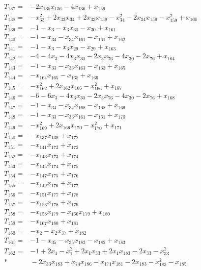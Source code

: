 \begin{align*}
T_{137}={}&-2x_{135}x_{136}-4x_{136}+x_{159}\\[3pt]
T_{138}={}&-x_{33}^{2}+2x_{33}x_{34}+2x_{33}x_{159}-x_{34}^{2}-2x_{34}x_{159}-x_{159}^{2}+x_{160}\\[3pt]
T_{139}={}&-1-x_{3}-x_{3}x_{30}-x_{30}+x_{161}\\[3pt]
T_{140}={}&-1-x_{34}-x_{34}x_{161}-x_{161}+x_{162}\\[3pt]
T_{141}={}&-1-x_{3}-x_{3}x_{29}-x_{29}+x_{163}\\[3pt]
T_{142}={}&-4-4x_{3}-4x_{3}x_{30}-2x_{3}x_{76}-4x_{30}-2x_{76}+x_{164}\\[3pt]
T_{143}={}&-1-x_{33}-x_{33}x_{163}-x_{163}+x_{165}\\[3pt]
T_{144}={}&-x_{164}x_{165}-x_{165}+x_{166}\\[3pt]
T_{145}={}&-x_{162}^{2}+2x_{162}x_{166}-x_{166}^{2}+x_{167}\\[3pt]
T_{146}={}&-6-6x_{3}-4x_{3}x_{30}-2x_{3}x_{76}-4x_{30}-2x_{76}+x_{168}\\[3pt]
T_{147}={}&-1-x_{34}-x_{34}x_{168}-x_{168}+x_{169}\\[3pt]
T_{148}={}&-1-x_{33}-x_{33}x_{161}-x_{161}+x_{170}\\[3pt]
T_{149}={}&-x_{169}^{2}+2x_{169}x_{170}-x_{170}^{2}+x_{171}\\[3pt]
T_{150}={}&-x_{137}x_{139}+x_{172}\\[3pt]
T_{151}={}&-x_{141}x_{172}+x_{173}\\[3pt]
T_{152}={}&-x_{143}x_{173}+x_{174}\\[3pt]
T_{153}={}&-x_{145}x_{174}+x_{175}\\[3pt]
T_{154}={}&-x_{147}x_{175}+x_{176}\\[3pt]
T_{155}={}&-x_{149}x_{176}+x_{177}\\[3pt]
T_{156}={}&-x_{151}x_{177}+x_{178}\\[3pt]
T_{157}={}&-x_{153}x_{178}+x_{179}\\[3pt]
T_{158}={}&-x_{158}x_{179}-x_{160}x_{179}+x_{180}\\[3pt]
T_{159}={}&-x_{167}x_{180}+x_{181}\\[3pt]
T_{160}={}&-x_{2}-x_{2}x_{37}+x_{182}\\[3pt]
T_{161}={}&-1-x_{35}-x_{35}x_{182}-x_{182}+x_{183}\\[3pt]
T_{162}={}&-1+2x_{1}-x_{1}^{2}+2x_{1}x_{33}+2x_{1}x_{183}-2x_{33}-x_{33}^{2}\\*
&{}-2x_{33}x_{183}+x_{74}x_{186}-x_{171}x_{181}-2x_{183}-x_{183}^{2}-x_{185}\\[3pt]

\end{align*}
